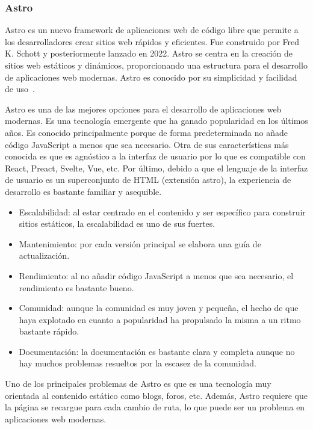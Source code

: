 \subsubsection{Astro}

Astro es un nuevo framework de aplicaciones web de código libre que permite a los desarrolladores crear sitios web rápidos y eficientes. Fue construido por Fred K. Schott y posteriormente lanzado en 2022. Astro se centra en la creación de sitios web estáticos y dinámicos, proporcionando una estructura para el desarrollo de aplicaciones web modernas. Astro es conocido por su simplicidad y facilidad de uso~\cite{astro-wikipedia}.

Astro es una de las mejores opciones para el desarrollo de aplicaciones web modernas. Es una tecnología emergente que ha ganado popularidad en los últimos años. Es conocido principalmente porque de forma predeterminada no añade código JavaScript a menos que sea necesario. Otra de sus características más conocida es que es agnóstico a la interfaz de usuario por lo que es compatible con React, Preact, Svelte, Vue, etc. Por último, debido a que el lenguaje de la interfaz de usuario es un superconjunto de HTML (extensión astro), la experiencia de desarrollo es bastante familiar y asequible.

\begin{itemize}
    \item[\bien] Escalabilidad: al estar centrado en el contenido y ser específico para construir sitios estáticos, la escalabilidad es uno de sus fuertes.
    \item[\bien] Mantenimiento: por cada versión principal se elabora una guía de actualización.
    \item[\esp] Rendimiento: al no añadir código JavaScript a menos que sea necesario, el rendimiento es bastante bueno.
    \item[\regular] Comunidad: aunque la comunidad es muy joven y pequeña, el hecho de que haya explotado en cuanto a popularidad ha propulsado la misma a un ritmo bastante rápido.
    \item[\regular] Documentación: la documentación es bastante clara y completa aunque no hay muchos problemas resueltos por la escasez de la comunidad.
\end{itemize}

Uno de los principales problemas de Astro es que es una tecnología muy orientada al contenido estático como blogs, foros, etc. Además, Astro requiere que la página se recargue para cada cambio de ruta, lo que puede ser un problema en aplicaciones web modernas.

